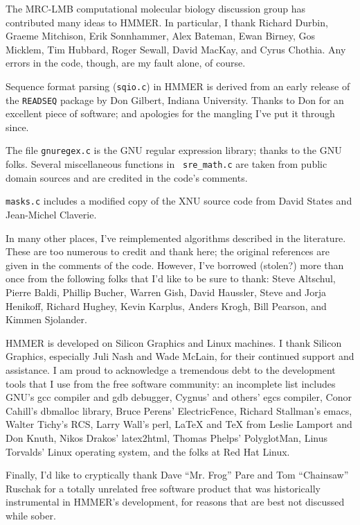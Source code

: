 The MRC-LMB computational molecular biology discussion group has
contributed many ideas to HMMER. In particular, I thank Richard
Durbin, Graeme Mitchison, Erik Sonnhammer, Alex Bateman, Ewan Birney,
Gos Micklem, Tim Hubbard, Roger Sewall, David MacKay, and Cyrus
Chothia. Any errors in the code, though, are my fault alone, of
course.

Sequence format parsing ({\tt sqio.c}) in HMMER is derived from an
early release of the {\tt READSEQ} package by Don Gilbert, Indiana
University. Thanks to Don for an excellent piece of software; and
apologies for the mangling I've put it through since. 

The file {\tt gnuregex.c} is the GNU regular expression library;
thanks to the GNU folks. Several miscellaneous functions in {\tt
sre\_math.c} are taken from public domain sources and are credited in
the code's comments.

{\tt masks.c} includes a modified copy of the XNU source code from
David States and Jean-Michel Claverie.

In many other places, I've reimplemented algorithms described in the
literature. These are too numerous to credit and thank here; the
original references are given in the comments of the code. However,
I've borrowed (stolen?) more than once from the following folks that
I'd like to be sure to thank: Steve Altschul, Pierre Baldi, Phillip
Bucher, Warren Gish, David Haussler, Steve and Jorja Henikoff, Richard
Hughey, Kevin Karplus, Anders Krogh, Bill Pearson, and Kimmen
Sjolander.

HMMER is developed on Silicon Graphics and Linux machines.  I thank
Silicon Graphics, especially Juli Nash and Wade McLain, for their
continued support and assistance. I am proud to acknowledge a
tremendous debt to the development tools that I use from the free
software community: an incomplete list includes GNU's gcc compiler and
gdb debugger, Cygnus' and others' egcs compiler, Conor Cahill's
dbmalloc library, Bruce Perens' ElectricFence, Richard Stallman's
emacs, Walter Tichy's RCS, Larry Wall's perl, LaTeX and TeX from
Leslie Lamport and Don Knuth, Nikos Drakos' latex2html, Thomas Phelps'
PolyglotMan, Linus Torvalds' Linux operating system, and the folks at
Red Hat Linux.

Finally, I'd like to cryptically thank Dave ``Mr. Frog'' Pare and Tom
``Chainsaw'' Ruschak for a totally unrelated free software product
that was historically instrumental in HMMER's development, for reasons
that are best not discussed while sober.
